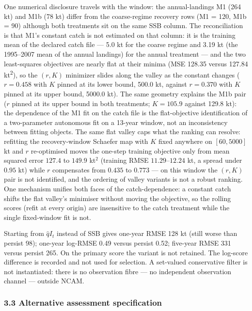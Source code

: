 \documentclass[11pt]{article}
\begin{document}
One numerical disclosure travels with the window: the annual-landings M1
(264 kt) and M1b (78 kt) differ from the coarse-regime recovery rows (M1
= 120, M1b = 90) although both treatments sit on the same SSB column.
The reconciliation is that M1's constant catch is not estimated on that
column: it is the training mean of the declared catch file --- 5.0 kt
for the coarse regime and 3.19 kt (the 1995--2007 mean of the annual
landings) for the annual treatment --- and the two least-squares
objectives are nearly flat at their minima (MSE 128.35 versus 127.84
kt\textsuperscript{2}), so the \((r, K)\) minimizer slides along the valley as the
constant changes (\(r = 0.458\) with \(K\) pinned at its lower bound,
500.0 kt, against \(r = 0.370\) with \(K\) pinned at its upper bound,
5000.0 kt). The same geometry explains the M1b pair (\(r\) pinned at its
upper bound in both treatments; \(K = 105.9\) against 129.8 kt): the
dependence of the M1 fit on the catch file is the flat-objective
identification of a two-parameter autonomous fit on a 13-year window,
not an inconsistency between fitting objects. The same flat valley caps
what the ranking can resolve: refitting the recovery-window Schaefer map
with \(K\) fixed anywhere on \([60, 5000]\) kt and \(r\) re-optimised
moves the one-step training objective only from mean squared error
\(127.4\) to \(149.9\) kt\(^2\) (training RMSE \(11.29\)--\(12.24\) kt,
a spread under \(0.95\) kt) while \(r\) compensates from \(0.435\) to
\(0.773\) --- on this window the \((r, K)\) pair is not identified, and
the ordering of valley variants is not a robust ranking. One mechanism
unifies both faces of the catch-dependence: a constant catch shifts the
flat valley's minimiser without moving the objective, so the rolling
scores (refit at every origin) are insensitive to the catch treatment
while the single fixed-window fit is not.

Starting from \(\hat q I_t\) instead of SSB gives one-year RMSE 128 kt
(still worse than persist 98); one-year log-RMSE 0.49 versus persist
0.52; five-year RMSE 331 versus persist 265. On the primary score the
variant is not retained. The log-score difference is recorded and not
used for selection. A set-valued conservative filter is not
instantiated: there is no observation fibre --- no independent
observation channel --- outside NCAM.

\subsubsection{3.3 Alternative assessment
specification}\label{alternative-assessment-specification}
\end{document}
